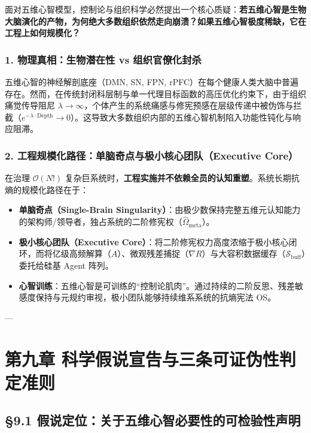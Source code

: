 \documentclass[11pt,a4paper,oneside]{ctexart}
\begin{document}
面对五维心智模型，控制论与组织科学必然提出一个核心质疑：\textbf{若五维心智是生物大脑演化的产物，为何绝大多数组织依然走向崩溃？如果五维心智极度稀缺，它在工程上如何规模化？}


\subsubsection{1. 物理真相：生物潜在性 vs 组织官僚化封杀}
五维心智的神经解剖底座（DMN, SN, FPN, rPFC）在每个健康人类大脑中普遍存在。然而，在传统封闭科层制与单一代理目标函数的高压优化约束下，由于组织痛觉传导阻尼 $\lambda \to \infty$，个体产生的系统痛感与修宪预感在层级传递中被伪饰与拦截（$e^{-\lambda \cdot \text{Depth}} \to 0$）。这导致大多数组织内部的五维心智机制陷入功能性钝化与响应阻滞。


\subsubsection{2. 工程规模化路径：单脑奇点与极小核心团队（Executive Core）}
在治理 $\mathcal{O}(N!)$ 复杂巨系统时，\textbf{工程实施并不依赖全员的认知重塑}。系统长期抗熵的规模化路径在于：

\begin{itemize}\item \textbf{单脑奇点（Single-Brain Singularity）}：由极少数保持完整五维元认知能力的架构师/领导者，独占系统的二阶修宪权（$\hat{\Omega}_{\text{meta}}$）。\end{itemize}
\begin{itemize}\item \textbf{极小核心团队（Executive Core）}：将二阶修宪权力高度浓缩于极小核心闭环，而将亿级高频解算（$A$）、微观残差捕捉（$\nabla R$）与大容积数据缓存（$\mathcal{S}_{\text{buff}}$）委托给硅基 Agent 阵列。\end{itemize}
\begin{itemize}\item \textbf{心智训练}：五维心智是可训练的“控制论肌肉”。通过持续的二阶反思、残差敏感度保持与元规约审视，极小团队能够持续维系系统的抗熵宪法 OS。\end{itemize}

---


\section{第九章 科学假说宣告与三条可证伪性判定准则}

\subsection{§9.1 假说定位：关于五维心智必要性的可检验性声明}
\end{document}
